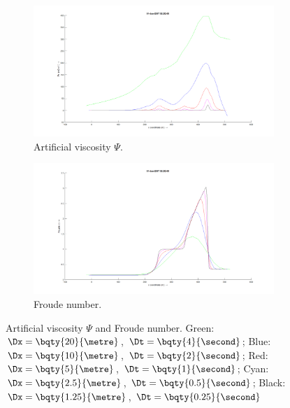\begin{figure}[H]
    \begin{subfigure}{0.5\textwidth}
        \includegraphics[width=\textwidth]{figures/weir_psi.png}
        \caption{Artificial viscosity $\Psi$.}
    \end{subfigure}
    \begin{subfigure}{0.5\textwidth}
        \includegraphics[width=\textwidth]{figures/weir_froude.png}
        \caption{Froude number.}
    \end{subfigure}
    \caption[Weir experiment: Artificial viscosity $\Psi$ and Froude number]{Artificial viscosity $\Psi$ and Froude number. Green: $\Dx = \bqty{20}{\metre}$, $\Dt = \bqty{4}{\second}$;
        Blue: $\Dx = \bqty{10}{\metre}$, $\Dt = \bqty{2}{\second}$;
        Red: $\Dx = \bqty{5}{\metre}$, $\Dt = \bqty{1}{\second}$;
        Cyan: $\Dx = \bqty{2.5}{\metre}$, $\Dt = \bqty{0.5}{\second}$;
        Black: $\Dx = \bqty{1.25}{\metre}$, $\Dt =\bqty{0.25}{\second}$
    }
\end{figure}
